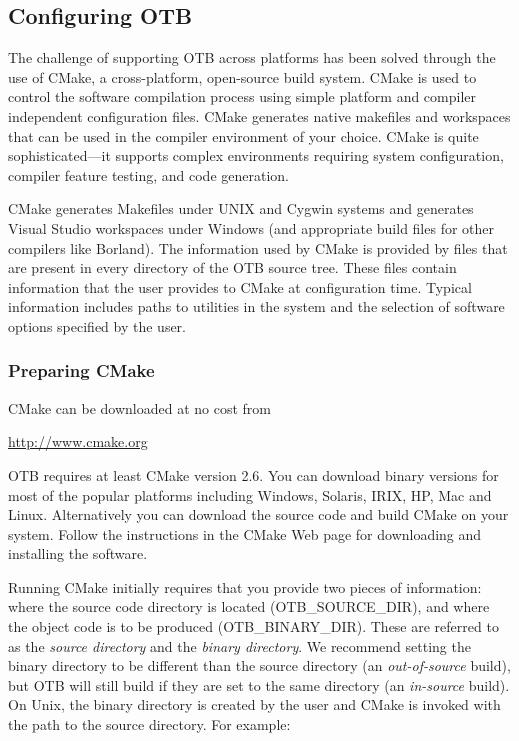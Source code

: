 \subsection{Configuring OTB}
\label{sec:ConfiguringOTB}


The challenge of supporting OTB across platforms has been solved through the
use of CMake, a cross-platform, open-source build system. CMake is used to
control the software compilation process using simple platform and compiler
independent configuration files.  CMake generates native makefiles and
workspaces that can be used in the compiler environment of your choice. CMake
is quite sophisticated---it supports complex environments requiring system
configuration, compiler feature testing, and code generation.

CMake generates Makefiles under UNIX and Cygwin systems and generates Visual
Studio workspaces under Windows (and appropriate build files for other
compilers like Borland). The information used by CMake is provided by
 files that are present in every directory of the OTB
source tree. These files contain information that the user
provides to CMake at configuration time. Typical information includes paths
to utilities in the system and the selection of software options specified by
the user.

\subsubsection{Preparing CMake}
\label{sec:CMakeforOTB}


CMake can be downloaded at no cost from
\begin{center}
  \url{http://www.cmake.org}
\end{center}

OTB requires at least CMake version 2.6. You can download binary
versions for most of the popular platforms including Windows, Solaris,
IRIX, HP, Mac and Linux. Alternatively you can download the source
code and build CMake on your system. Follow the instructions in the
CMake Web page for downloading and installing the software.

Running CMake initially requires that you provide two pieces of
information: where the source code directory is located
(OTB\_SOURCE\_DIR), and where the object code is to be produced
(OTB\_BINARY\_DIR). These are referred to as the \emph{source
directory} and the \emph{binary directory}. We recommend setting the
binary directory to be different than the source directory (an
\emph{out-of-source} build), but OTB will still build if they are set
to the same directory (an \emph{in-source} build).  On Unix, the
binary directory is created by the user and CMake is invoked with the
path to the source directory. For example:

